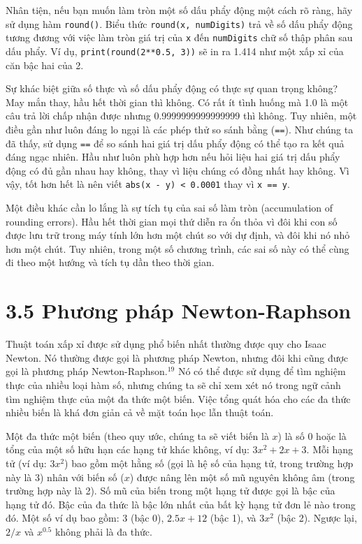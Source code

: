 Nhân tiện, nếu bạn muốn làm tròn một số dấu phẩy động một cách rõ ràng, hãy sử dụng hàm \texttt{round()}. Biểu thức \texttt{round(x, numDigits)} trả về số dấu phẩy động tương đương với việc làm tròn giá trị của \texttt{x} đến \texttt{numDigits} chữ số thập phân sau dấu phẩy. Ví dụ, \texttt{print(round(2**0.5, 3))} sẽ in ra 1.414 như một xấp xỉ của căn bậc hai của 2.

Sự khác biệt giữa số thực và số dấu phẩy động có thực sự quan trọng không? May mắn thay, hầu hết thời gian thì không. Có rất ít tình huống mà 1.0 là một câu trả lời chấp nhận được nhưng 0.9999999999999999 thì không. Tuy nhiên, một điều gần như luôn đáng lo ngại là các phép thử so sánh bằng (\texttt{==}). Như chúng ta đã thấy, sử dụng \texttt{==} để so sánh hai giá trị dấu phẩy động có thể tạo ra kết quả đáng ngạc nhiên. Hầu như luôn phù hợp hơn nếu hỏi liệu hai giá trị dấu phẩy động có đủ gần nhau hay không, thay vì liệu chúng có đồng nhất hay không. Vì vậy, tốt hơn hết là nên viết \texttt{abs(x - y) < 0.0001} thay vì \texttt{x == y}.

Một điều khác cần lo lắng là sự tích tụ của sai số làm tròn (accumulation of rounding errors). Hầu hết thời gian mọi thứ diễn ra ổn thỏa vì đôi khi con số được lưu trữ trong máy tính lớn hơn một chút so với dự định, và đôi khi nó nhỏ hơn một chút. Tuy nhiên, trong một số chương trình, các sai số này có thể cùng đi theo một hướng và tích tụ dần theo thời gian.

\section*{3.5 Phương pháp Newton-Raphson}

\noindent \indent Thuật toán xấp xỉ được sử dụng phổ biến nhất thường được quy cho Isaac Newton. Nó thường được gọi là phương pháp Newton, nhưng đôi khi cũng được gọi là phương pháp Newton-Raphson.$^{19}$ Nó có thể được sử dụng để tìm nghiệm thực của nhiều loại hàm số, nhưng chúng ta sẽ chỉ xem xét nó trong ngữ cảnh tìm nghiệm thực của một đa thức một biến. Việc tổng quát hóa cho các đa thức nhiều biến là khá đơn giản cả về mặt toán học lẫn thuật toán.

Một đa thức một biến (theo quy ước, chúng ta sẽ viết biến là $x$) là số 0 hoặc là tổng của một số hữu hạn các hạng tử khác không, ví dụ: $3x^2 + 2x + 3$. Mỗi hạng tử (ví dụ: $3x^2$) bao gồm một hằng số (gọi là hệ số của hạng tử, trong trường hợp này là 3) nhân với biến số ($x$) được nâng lên một số mũ nguyên không âm (trong trường hợp này là 2). Số mũ của biến trong một hạng tử được gọi là bậc của hạng tử đó. Bậc của đa thức là bậc lớn nhất của bất kỳ hạng tử đơn lẻ nào trong đó. Một số ví dụ bao gồm: $3$ (bậc 0), $2.5x + 12$ (bậc 1), và $3x^2$ (bậc 2). Ngược lại, $2/x$ và $x^{0.5}$ không phải là đa thức.

